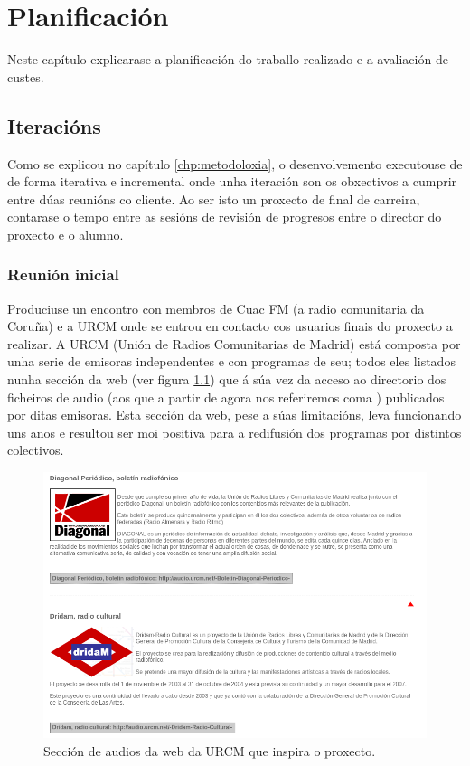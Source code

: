 \chapter[Planificación]{
  \label{chp:plan}
  Planificación
}
\minitoc
\newpage

Neste capítulo explicarase a planificación do traballo realizado e a avaliación de custes.  

\section{Iteracións}

Como se explicou no capítulo \ref{chp:metodoloxia}, o desenvolvemento executouse de  de forma iterativa e incremental onde unha iteración son os obxectivos a cumprir entre dúas reunións co cliente. Ao ser isto un proxecto de final de carreira, contarase o tempo entre as sesións de revisión de progresos entre o director do proxecto e o alumno.

\subsection{Reunión inicial}

Produciuse un encontro con membros de Cuac FM (a radio comunitaria da Coruña) e a URCM onde se entrou en contacto cos usuarios finais do proxecto a realizar. A URCM (Unión de Radios Comunitarias de Madrid) está composta por unha serie de emisoras independentes e con programas de seu; todos eles listados nunha sección da web (ver figura \ref{fig:urcm}) que á súa vez da acceso ao directorio dos ficheiros de audio (aos que a partir de agora nos referiremos coma ) publicados por ditas emisoras. Esta sección da web, pese a súas limitacións, leva funcionando uns anos e resultou ser moi positiva para a redifusión dos programas por distintos colectivos.

\begin{figure}[h]
	\centering
	\includegraphics[scale=0.55,keepaspectratio=true]{./images/urcm.png}
	\caption{Sección de audios da web da URCM que inspira o proxecto.}
	\label{fig:urcm}
\end{figure}

